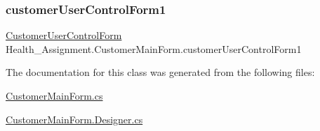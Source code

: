 \subsubsection{\texorpdfstring{customer\+User\+Control\+Form1}{customerUserControlForm1}}
{\footnotesize\ttfamily \hyperlink{class_health___assignment_1_1_customer_user_control_form}{Customer\+User\+Control\+Form} Health\+\_\+\+Assignment.\+Customer\+Main\+Form.\+customer\+User\+Control\+Form1}



The documentation for this class was generated from the following files\+:\begin{DoxyCompactItemize}
\item 
\hyperlink{_customer_main_form_8cs}{Customer\+Main\+Form.\+cs}\item 
\hyperlink{_customer_main_form_8_designer_8cs}{Customer\+Main\+Form.\+Designer.\+cs}\end{DoxyCompactItemize}
